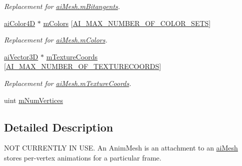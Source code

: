 \begin{DoxyCompactItemize}
\begin{DoxyCompactList}\small\item\em Replacement for {\ttfamily \hyperlink{structassimp_1_1mesh_1_1ai_mesh_af4383669a527d07e3d40bfc270d0d882}{ai\+Mesh.\+m\+Bitangents}}. \end{DoxyCompactList}\item 
\hypertarget{structassimp_1_1mesh_1_1ai_anim_mesh_a48635c25cd483b2e52c68407a4bc24f4}{\hyperlink{structai_color4_d}{ai\+Color4\+D} $\ast$ \hyperlink{structassimp_1_1mesh_1_1ai_anim_mesh_a48635c25cd483b2e52c68407a4bc24f4}{m\+Colors} \mbox{[}\hyperlink{namespaceassimp_1_1mesh_a8dd324586aa52f6749c07ddd0ddee1b3}{A\+I\+\_\+\+M\+A\+X\+\_\+\+N\+U\+M\+B\+E\+R\+\_\+\+O\+F\+\_\+\+C\+O\+L\+O\+R\+\_\+\+S\+E\+T\+S}\mbox{]}}\label{structassimp_1_1mesh_1_1ai_anim_mesh_a48635c25cd483b2e52c68407a4bc24f4}

\begin{DoxyCompactList}\small\item\em Replacement for {\ttfamily \hyperlink{structassimp_1_1mesh_1_1ai_mesh_a66060363bc944adb352801b977b3a102}{ai\+Mesh.\+m\+Colors}}. \end{DoxyCompactList}\item 
\hypertarget{structassimp_1_1mesh_1_1ai_anim_mesh_a7a6a649aa0d7bbbd145629fa07ac569a}{\hyperlink{structai_vector3_d}{ai\+Vector3\+D} $\ast$ \hyperlink{structassimp_1_1mesh_1_1ai_anim_mesh_a7a6a649aa0d7bbbd145629fa07ac569a}{m\+Texture\+Coords} \mbox{[}\hyperlink{namespaceassimp_1_1mesh_a3a8dfbb9ee6186e1d78d2a8dfa909a10}{A\+I\+\_\+\+M\+A\+X\+\_\+\+N\+U\+M\+B\+E\+R\+\_\+\+O\+F\+\_\+\+T\+E\+X\+T\+U\+R\+E\+C\+O\+O\+R\+D\+S}\mbox{]}}\label{structassimp_1_1mesh_1_1ai_anim_mesh_a7a6a649aa0d7bbbd145629fa07ac569a}

\begin{DoxyCompactList}\small\item\em Replacement for {\ttfamily \hyperlink{structassimp_1_1mesh_1_1ai_mesh_a93b9896f1b98b8368cd3c869ea4f2a98}{ai\+Mesh.\+m\+Texture\+Coords}}. \end{DoxyCompactList}\item 
uint \hyperlink{structassimp_1_1mesh_1_1ai_anim_mesh_a27ffb0b815ed3f6936fa42b54217dfe7}{m\+Num\+Vertices}
\end{DoxyCompactItemize}


\subsection{Detailed Description}
N\+O\+T C\+U\+R\+R\+E\+N\+T\+L\+Y I\+N U\+S\+E. An Anim\+Mesh is an attachment to an \hyperlink{structai_mesh}{ai\+Mesh} stores per-\/vertex animations for a particular frame.

